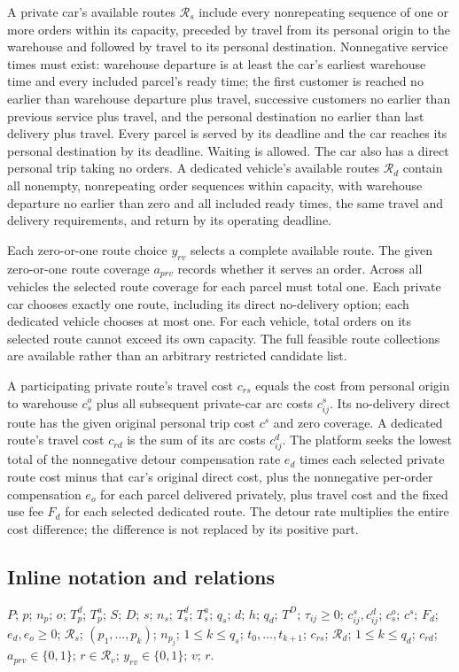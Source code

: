 \documentclass[10pt]{article}
\begin{document}
A private car's available routes $\mathcal R_s$ include every nonrepeating sequence of one or more orders within its capacity, preceded by travel from its personal origin to the warehouse and followed by travel to its personal destination. Nonnegative service times must exist: warehouse departure is at least the car's earliest warehouse time and every included parcel's ready time; the first customer is reached no earlier than warehouse departure plus travel, successive customers no earlier than previous service plus travel, and the personal destination no earlier than last delivery plus travel. Every parcel is served by its deadline and the car reaches its personal destination by its deadline. Waiting is allowed. The car also has a direct personal trip taking no orders. A dedicated vehicle's available routes $\mathcal R_d$ contain all nonempty, nonrepeating order sequences within capacity, with warehouse departure no earlier than zero and all included ready times, the same travel and delivery requirements, and return by its operating deadline.

Each zero-or-one route choice $y_{rv}$ selects a complete available route. The given zero-or-one route coverage $a_{prv}$ records whether it serves an order. Across all vehicles the selected route coverage for each parcel must total one. Each private car chooses exactly one route, including its direct no-delivery option; each dedicated vehicle chooses at most one. For each vehicle, total orders on its selected route cannot exceed its own capacity. The full feasible route collections are available rather than an arbitrary restricted candidate list.

A participating private route's travel cost $c_{rs}$ equals the cost from personal origin to warehouse $c_s^o$ plus all subsequent private-car arc costs $c^s_{ij}$. Its no-delivery direct route has the given original personal trip cost $c^s$ and zero coverage. A dedicated route's travel cost $c_{rd}$ is the sum of its arc costs $c^d_{ij}$. The platform seeks the lowest total of the nonnegative detour compensation rate $e_d$ times each selected private route cost minus that car's original direct cost, plus the nonnegative per-order compensation $e_o$ for each parcel delivered privately, plus travel cost and the fixed use fee $F_d$ for each selected dedicated route. The detour rate multiplies the entire cost difference; the difference is not replaced by its positive part.

\subsection*{Inline notation and relations}
$P$; $p$; $n_p$; $o$; $T_p^d$; $T_p^a$; $S$; $D$; $s$; $n_s$; $T_s^d$; $T_s^a$; $q_s$; $d$; $h$; $q_d$; $T^D$; $\tau_{ij}\ge0$; $c^s_{ij},c^d_{ij}$; $c_s^o$; $c^s$; $F_d$; $e_d,e_o\ge0$; $\mathcal R_s$; $(p_1,\ldots,p_k)$; $n_{p_j}$; $1\le k\le q_s$; $t_0,\ldots,t_{k+1}$; $c_{rs}$; $\mathcal R_d$; $1\le k\le q_d$; $c_{rd}$; $a_{prv}\in\{0,1\}$; $r\in\mathcal R_v$; $y_{rv}\in\{0,1\}$; $v$; $r$.
\end{document}
